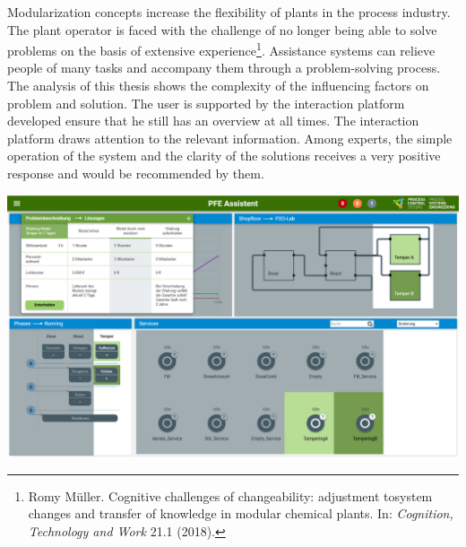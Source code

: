 Modularization concepts increase the flexibility of plants in the process industry. The plant operator is faced with the challenge of no longer being able to solve problems on the basis of extensive experience\footnote[1]{Romy Müller. \glqq Cognitive challenges of changeability: adjustment tosystem changes and transfer of knowledge in modular chemical plants\grqq. In: \textit{Cognition, Technology and Work} 21.1 (2018).}. Assistance systems can relieve people of many tasks and accompany them through a problem-solving process. The analysis of this thesis shows the complexity of the influencing factors on problem and solution. The user is supported by the interaction platform developed ensure that he still has an overview at all times. The interaction platform draws attention to the relevant information. Among experts, the simple operation of the system and the clarity of the solutions receives a very positive response and would be recommended by them.

\vspace{10pt}
\begin{center}
\includegraphics[scale=0.25]{DA_files/Bilder/Konzept/Skizze-Loesungen-PFE.png}
\end{center}
\vspace{6pt}